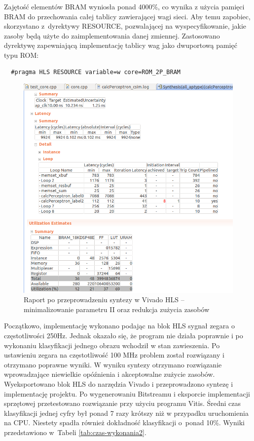 Zajętość elementów BRAM wyniosła ponad 4000\%, co wynika z użycia pamięci BRAM do przechowania całej tablicy zawierającej wagi sieci. Aby temu zapobiec, skorzystano z~dyrektywy RESOURCE, pozwalającej na wyspecyfikowanie, jakie zasoby będą użyte do zaimplementowania danej zmiennej. Zastosowano dyrektywę zapewniającą implementację tablicy wag jako dwuportową pamięć typu ROM:
\begin{verbatim}
  #pragma HLS RESOURCE variable=w core=ROM_2P_BRAM
\end{verbatim}


\begin{figure}[!h]
  \centering
  \includegraphics[width=\textwidth]{img/hls-report4.png}
  \caption{Raport po przeprowadzeniu syntezy w Vivado HLS -- minimalizowanie parametru II oraz redukcja zużycia zasobów}
  \label{hls-report4}
\end{figure}

Początkowo, implementację wykonano podając na blok HLS sygnał zegara o częstotliwości 250Hz. Jednak okazało się, że program nie działa poprawnie i po wykonaniu klasyfikacji jednego obrazu wchodził w stan zawieszenia. Po ustawieniu zegara na częstotliwość 100 MHz problem został rozwiązany i otrzymano poprawne wyniki. W wyniku syntezy otrzymano rozwiązanie wprowadzające niewielkie opóźnienia i akceptowalne zużycie zasobów. 
Wyeksportowano blok HLS do narzędzia Vivado i przeprowadzono syntezę i implementację projektu. Po wygenerowaniu Bitstreamu i eksporcie implementacji sprzętowej przetestowano rozwiązanie przy użyciu programu Vitis. Średni czas klasyfikacji jednej cyfry był ponad 7 razy krótszy niż w przypadku uruchomienia na CPU. Niestety spadła również dokładność klasyfikacji o~ponad 10\%. Wyniki przedstawiono w~Tabeli \ref{tab:czas-wykonania2}.

